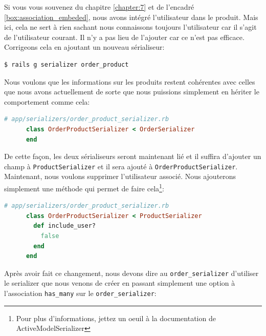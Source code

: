 \documentclass[]{report}
\begin{document}
    Si vous vous souvenez du chapitre \ref{chapter:7} et de l'encadré \ref{box:association_embeded}, nous avons intégré l'utilisateur dans le produit. Mais ici, cela ne sert à rien sachant nous connaissons toujours l'utilisateur car il s'agit de l'utilisateur courant. Il n'y a pas lieu de l'ajouter car ce n'est pas efficace. Corrigeons cela en ajoutant un nouveau sérialiseur:

    \begin{scriptsize}
      \begin{lstlisting}[language=bash]
      $ rails g serializer order_product
      \end{lstlisting}
    \end{scriptsize}

    Nous voulons que les informations sur les produits restent cohérentes avec celles que nous avons actuellement de sorte que nous puissions simplement en hériter le comportement comme cela:

    \begin{scriptsize}
      \begin{lstlisting}[language=ruby]
      # app/serializers/order_product_serializer.rb
      class OrderProductSerializer < OrderSerializer
      end
      \end{lstlisting}
    \end{scriptsize}

    De cette façon, les deux sérialiseurs seront maintenant lié et il suffira d'ajouter un champ à \verb|ProductSerializer| et il sera ajouté à \verb|OrderProductSerializer|. Maintenant, nous voulons supprimer l'utilisateur associé. Nous ajouterons simplement une méthode qui permet de faire cela\footnote{Pour plus d'informations, jettez un oeuil à la documentation de  ActiveModelSerializer}:

    \begin{scriptsize}
      \begin{lstlisting}[language=ruby]
      # app/serializers/order_product_serializer.rb
      class OrderProductSerializer < ProductSerializer
        def include_user?
          false
        end
      end
      \end{lstlisting}
    \end{scriptsize}

    Après avoir fait ce changement, nous devons dire au \verb|order_serializer| d'utiliser le serializer que nous venons de créer en passant simplement une option à l'association \verb|has_many| sur le \verb|order_serializer|:
\end{document}
